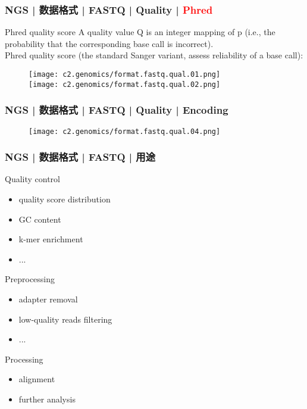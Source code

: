 \begin{frame}
  \frametitle{NGS | 数据格式 | FASTQ | Quality | \textcolor{red}{Phred}}
  \begin{block}{Phred quality score}
A quality value Q is an integer mapping of p (i.e., the probability that the corresponding base call is incorrect).\\
\vspace{1em}
Phred quality score (the standard Sanger variant, assess reliability of a base call):
  \end{block}
  \begin{figure}
    \centering
    \texttt{[image: c2.genomics/format.fastq.qual.01.png]}\\
    \vspace{1em}
    \texttt{[image: c2.genomics/format.fastq.qual.02.png]}
  \end{figure}
\end{frame}

\begin{frame}
  \frametitle{NGS | 数据格式 | FASTQ | Quality | Encoding}
  \begin{figure}
    \centering
    \texttt{[image: c2.genomics/format.fastq.qual.04.png]}
  \end{figure}
\end{frame}

\begin{frame}
  \frametitle{NGS | 数据格式 | FASTQ | 用途}
  \begin{block}{Quality control}
    \begin{itemize}
      \item quality score distribution
      \item GC content
      \item k-mer enrichment
      \item ...
    \end{itemize}
  \end{block}
  \pause
  \begin{block}{Preprocessing}
    \begin{itemize}
      \item adapter removal
      \item low-quality reads filtering
      \item ...
    \end{itemize}
  \end{block}
  \pause
  \begin{block}{Processing}
    \begin{itemize}
      \item alignment
      \item further analysis
    \end{itemize}
  \end{block}
\end{frame}

